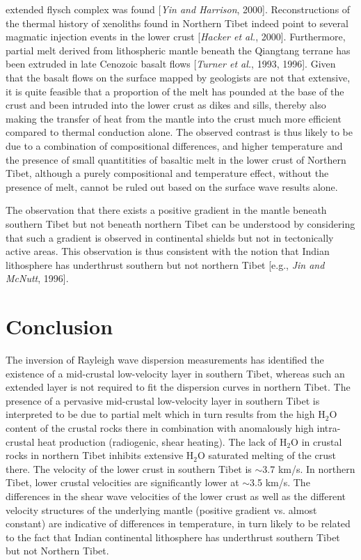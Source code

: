 \documentclass[12pt]{article}
\begin{document}
extended flysch complex was found [{\it Yin and Harrison}, 2000].
Reconstructions of the thermal history of xenoliths found in Northern
Tibet indeed point to several magmatic injection events in the lower
crust [{\it Hacker et al.}, 2000].
Furthermore, partial melt derived from lithospheric mantle beneath the Qiangtang terrane has been extruded 
in late Cenozoic basalt flows [{\it Turner et al.}, 1993, 1996].  Given that the basalt flows on the 
surface mapped by geologists are not that extensive, it is quite feasible that a proportion of the 
melt has pounded at the base of the crust and been intruded into the lower crust as dikes and sills, 
thereby also making the transfer of heat from the mantle into the crust much more efficient compared to thermal 
conduction alone. 
The observed contrast is thus likely to be due to
a combination of compositional differences, and higher temperature and the presence of small quantitities
of basaltic melt in the lower crust of Northern Tibet, although a
purely compositional and temperature effect, without the presence of
melt, cannot be ruled out based on the surface wave results alone.

 The observation that there exists a positive gradient in the mantle
beneath southern Tibet but not beneath northern Tibet can be
understood by considering that such a gradient is observed in
continental shields but not in tectonically active areas.  This
observation is thus consistent with the notion that Indian lithosphere
has underthrust southern but not northern Tibet [e.g., {\it Jin and
McNutt}, 1996]. 

\section{Conclusion} 

The inversion of Rayleigh wave dispersion measurements has identified the existence of a mid-crustal 
low-velocity layer in southern Tibet, whereas such an extended layer is not required to fit the dispersion 
curves in northern Tibet.  The presence of a pervasive mid-crustal low-velocity layer in southern Tibet is 
interpreted to be due to partial melt which in turn results from the high H$_2$O content of the crustal rocks there in combination with 
anomalously high intra-crustal heat production (radiogenic, shear heating).   The lack of H$_2$O in crustal 
rocks in northern Tibet inhibits extensive H$_2$O saturated melting of the crust there.  The velocity of the 
lower crust in southern Tibet is $\sim$3.7 km/s.  In northern Tibet, lower crustal velocities are significantly 
lower at $\sim$3.5 km/s.  The differences in the shear wave velocities of the lower crust as well as the different velocity structures  of the underlying mantle (positive gradient vs. almost constant) are 
indicative of differences in temperature, in turn likely to be related to the fact that Indian continental lithosphere has underthrust southern Tibet but not Northern Tibet.
\end{document}
